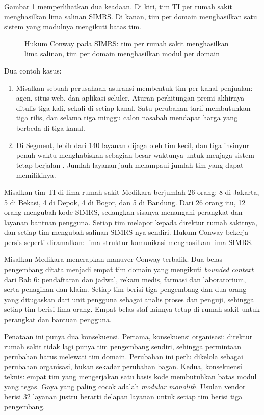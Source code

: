 Gambar \ref{fig:ch07-conway} memperlihatkan dua keadaan. Di kiri, tim TI per rumah sakit
menghasilkan lima salinan SIMRS. Di kanan, tim per domain menghasilkan satu sistem yang modulnya
mengikuti batas tim.

\begin{figure}[!htb]
  \centering
  
  \caption{Hukum Conway pada SIMRS: tim per rumah sakit menghasilkan lima
           salinan, tim per domain menghasilkan modul per domain}
  \label{fig:ch07-conway}
\end{figure}

Dua contoh kasus:
\begin{enumerate}
  \item Misalkan sebuah perusahaan asuransi membentuk tim per kanal penjualan: agen, situs web, dan
        aplikasi seluler. Aturan perhitungan premi akhirnya ditulis tiga kali, sekali di setiap
        kanal. Satu perubahan tarif membutuhkan tiga rilis, dan selama tiga minggu calon nasabah
        mendapat harga yang berbeda di tiga kanal.
  \item Di Segment, lebih dari 140 layanan dijaga oleh tim kecil, dan tiga insinyur penuh waktu
        menghabiskan sebagian besar waktunya untuk menjaga sistem tetap berjalan
        \cite{noonan2018}. Jumlah layanan jauh melampaui jumlah tim yang dapat memilikinya.
\end{enumerate}

\begin{kasus}[title={Kasus Medikara Health: Tim TI per Rumah Sakit dan Lima SIMRS}]
  Misalkan tim TI di lima rumah sakit Medikara berjumlah 26 orang: 8 di Jakarta, 5 di Bekasi, 4 di
  Depok, 4 di Bogor, dan 5 di Bandung. Dari 26 orang itu, 12 orang mengubah kode SIMRS, sedangkan
  sisanya menangani perangkat dan layanan bantuan pengguna. Setiap tim melapor kepada direktur
  rumah sakitnya, dan setiap tim mengubah salinan SIMRS-nya sendiri. Hukum Conway bekerja persis
  seperti diramalkan: lima struktur komunikasi menghasilkan lima SIMRS.

  Misalkan Medikara menerapkan manuver Conway terbalik. Dua belas pengembang ditata menjadi empat
  tim domain yang mengikuti \textit{bounded context} dari Bab 6: pendaftaran dan jadwal, rekam
  medis, farmasi dan laboratorium, serta penagihan dan klaim. Setiap tim berisi tiga pengembang dan
  dua orang yang ditugaskan dari unit pengguna sebagai analis proses dan penguji, sehingga setiap
  tim berisi lima orang. Empat belas staf lainnya tetap di rumah sakit untuk perangkat dan bantuan
  pengguna.

  Penataan ini punya dua konsekuensi. Pertama, konsekuensi organisasi: direktur rumah sakit tidak
  lagi punya tim pengembang sendiri, sehingga permintaan perubahan harus melewati tim domain.
  Perubahan ini perlu dikelola sebagai perubahan organisasi, bukan sekadar perubahan bagan.
  Kedua, konsekuensi teknis: empat tim yang mengerjakan satu basis kode membutuhkan batas modul
  yang tegas. Gaya yang paling cocok adalah \textit{modular monolith}. Usulan vendor berisi 32
  layanan justru berarti delapan layanan untuk setiap tim berisi tiga pengembang.
\end{kasus}

